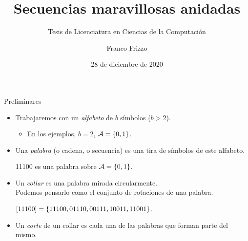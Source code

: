 \documentclass[spanish,xcolor={table}]{beamer}
\title{Secuencias maravillosas anidadas}
\subtitle{Tesis de Licenciatura en Ciencias de la Computación}
\author{Franco Frizzo}
\institute[DC, FCEyN, UBA]
    {Departamento de Computación, FCEyN, UBA}
\date{28 de diciembre de 2020}
\begin{document}
\frame{\titlepage}


\begin{frame}{Preliminares}

\begin{itemize}
  \item Trabajaremos con un \emph{alfabeto} de $b$ símbolos ($b > 2$).
  \begin{itemize}
    \item En los ejemplos, $b = 2$, $\mathcal{A} = \lbrace 0, 1 \rbrace$.
  \end{itemize}
  \pause
  
  \item Una \emph{palabra} (o cadena, o secuencia) es una tira de símbolos de este alfabeto.
  
  \begin{example}
    11100 es una palabra sobre $\mathcal{A} = \lbrace 0, 1 \rbrace$.
  \end{example}
  \pause
  
  \item Un \emph{collar} es una palabra mirada circularmente. \\
  Podemos pensarlo como el conjunto de rotaciones de una palabra.
  
  \begin{example}
    $\left[11100\right] = \lbrace 11100, 01110, 00111, 10011, 11001 \rbrace$.
  \end{example}
  \pause
  
  \item Un \emph{corte} de un collar es cada una de las palabras que forman
  parte del mismo.
\end{itemize}

\end{frame}

\end{document}
